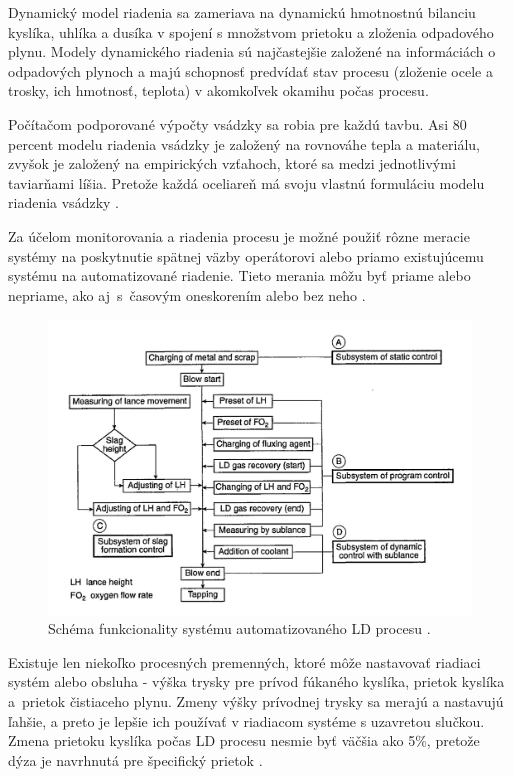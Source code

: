 \documentclass[]{tukediphc}
\begin{document}
Dynamický model riadenia sa zameriava na dynamickú hmotnostnú bilanciu kyslíka, uhlíka a dusíka v spojení s množstvom prietoku a zloženia odpadového plynu. Modely dynamického riadenia sú najčastejšie založené na informáciách o odpadových plynoch a majú schopnosť predvídať stav procesu (zloženie ocele a trosky, ich hmotnosť, teplota) v akomkoľvek okamihu počas procesu.

Počítačom podporované výpočty vsádzky sa robia pre každú tavbu. Asi 80 percent modelu riadenia vsádzky je založený na rovnováhe tepla a materiálu, zvyšok je založený na empirických vzťahoch, ktoré sa medzi jednotlivými taviarňami líšia. Pretože každá oceliareň má svoju vlastnú formuláciu modelu riadenia vsádzky \cite{Turkdogan1996}.

Za účelom monitorovania a riadenia procesu je možné použiť rôzne meracie systémy na poskytnutie spätnej väzby operátorovi alebo priamo existujúcemu systému na automatizované riadenie. Tieto merania môžu byť priame alebo nepriame, ako aj~s~časovým oneskorením alebo bez neho \cite{Widlund1998}.

\begin{figure}[h!]
	\centering
	\includegraphics[width=.9\textwidth,angle=0]{figures/schematic-bof.jpg}
	\caption{Schéma funkcionality systému automatizovaného LD procesu \citep{Turkdogan1996}.}
	\label{o:21}
\end{figure}

Existuje len niekoľko procesných premenných, ktoré môže nastavovať riadiaci systém alebo obsluha - výška trysky pre prívod fúkaného kyslíka, prietok kyslíka a~prietok čistiaceho plynu. Zmeny výšky prívodnej trysky sa merajú a nastavujú ľahšie, a preto je lepšie ich používať v riadiacom systéme s uzavretou slučkou. Zmena prietoku kyslíka počas LD procesu nesmie byť väčšia ako 5\%, pretože dýza je navrhnutá pre špecifický prietok \cite{Widlund1998}.
\end{document}

